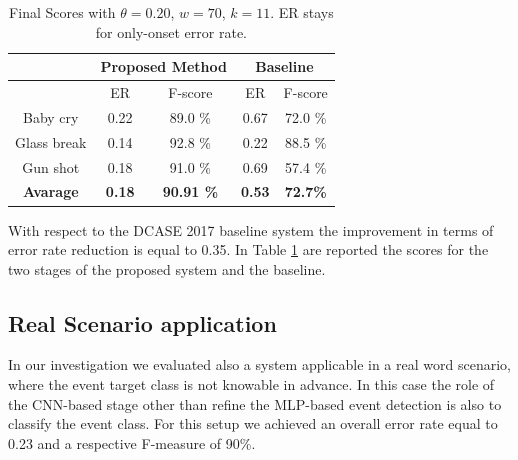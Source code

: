 \documentclass{article}
\begin{document}
\begin{sloppy}
 \begin{table}[t] 
 	\caption{Final Scores with $\theta=0.20$, $w=70$, $k=11$.  ER stays for only-onset error rate.}\label{tbl:finalScore} 
 	\centering 
 	\footnotesize 
 	\begin{tabular} {| c | c | c | c | c |} 
 		\hline 
 		& \multicolumn{2}{c|}{Proposed Method}&\multicolumn{2}{c|}{Baseline}\\ 
 		\hline   
 		& ER    &  F-score  & ER    &  F-score  \\   
 		\hline                                      
 		Baby cry    & 0.22  & 89.0 \%      & 0.67  & 72.0 \%\\ 
 		\hline                                      
 		Glass break & 0.14  & 92.8 \%        & 0.22  & 88.5 \%\\ 
 		\hline 
 		Gun shot    & 0.18  & 91.0 \%        & 0.69  & 57.4 \%\\ 
 		\hline 
 		\textbf{Avarage} & \textbf{0.18} & \textbf{90.91 \%}& \textbf{0.53} & \textbf{72.7\%}\\ 
 		\hline 
 		
 	\end{tabular} 
 	
 \end{table} 


With respect to the DCASE 2017 baseline system the improvement in terms of error rate reduction is equal to 0.35. In Table \ref{tbl:finalScore} are reported the scores for the two stages of the proposed system and the baseline.

\subsection{Real Scenario application}
In our investigation we evaluated also a system applicable in a real word scenario, where the event target class is not knowable in advance. In this case the role of the CNN-based stage other than refine the MLP-based event detection is also to classify the event class. For this setup we achieved an overall error rate equal to 0.23 and a respective F-measure of 90\%.


\end{sloppy}
\end{document}
